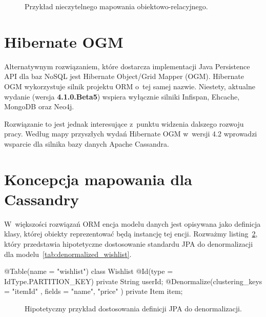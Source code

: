 \begin{figure}[ht!]
	\centering
	\theverbbox
	\caption{Przykład nieczytelnego mapowania obiektowo-relacyjnego.}
	\label{vrb:awful_orm}
\end{figure}

\section{Hibernate OGM}
\label{sec:hibernate_ogm}

Alternatywnym rozwiązaniem, które dostarcza implementacji Java Persistence API dla baz NoSQL jest Hibernate Object/Grid Mapper (OGM). Hibernate OGM wykorzystuje silnik projektu ORM o~tej samej nazwie. Niestety, aktualne wydanie (wersja \textbf{4.1.0.Beta5}) wspiera wyłącznie silniki Infispan, Ehcache, MongoDB oraz Neo4j. 

Rozwiązanie to jest jednak interesujące z~punktu widzenia dalszego rozwoju pracy. Według mapy przyszłych wydań Hibernate OGM w~wersji 4.2 wprowadzi wsparcie dla silnika bazy danych Apache Cassandra.~\cite{hibernate_ogm_roadmap} 

\section{Koncepcja mapowania dla Cassandry}
\label{sec:om_for_cassandra_concept}

W~większości rozwiązań ORM encja modelu danych jest opisywana jako definicja klasy, której obiekty reprezentować będą instancję tej encji. Rozważmy listing~\ref{vrb:jpa_denormalization_theory}, który przedstawia hipotetyczne dostosowanie standardu JPA do denormalizacji dla modelu~\ref{tab:denormalized_wishlist}.

\begin{verbbox}[\footnotesize]
	@Table(name = "wishlist")
	class Wishlist {
	    @Id(type = IdType.PARTITION_KEY) 
	    private String userId;
	    @Denormalize(clustering_keys = { "itemId" }, 
	                 fields = { "name", "price" })
	    private Item item;
	}
\end{verbbox}

\begin{figure}[ht!]
	\centering
	\theverbbox
	\caption{Hipotetyczny przykład dostosowania definicji JPA do denormalizacji.}
	\label{vrb:jpa_denormalization_theory}
\end{figure}

